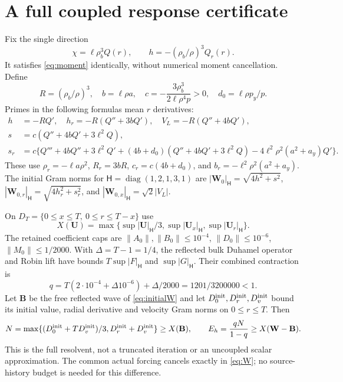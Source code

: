 \documentclass[11pt]{article}
\newcommand{\norm}[1]{\lVert #1\rVert}
\begin{document}
\section{A full coupled response certificate}\label{sec:bounds}

Fix the single direction
\begin{equation}
 \chi=\ell\rho_b^3Q(r),\qquad h=-(\rho_b/\rho)^3Q_r(r).
 \label{eq:direction}
\end{equation}
It satisfies \eqref{eq:moment} identically, without numerical moment
cancellation. Define
\begin{equation}
 R=(\rho_b/\rho)^3,\quad b=\ell\rho a,\quad
 c=-\frac{3\rho_b^3}{2\ell\rho^4p}>0,\quad d_0=\ell\rho p_y/p.
 \label{eq:profileconstants}
\end{equation}
Primes in the following formulas mean $r$ derivatives:
\begin{align}
 h&=-RQ',\quad h_r=-R(Q''+3bQ'),\quad
 V_L=-R(Q''+4bQ'),\nonumber\\
 s&=c(Q''+4bQ'+3\ell^2Q),\label{eq:profiles}\\
 s_r&=c\{Q'''+4bQ''+3\ell^2Q'
 +(4b+d_0)(Q''+4bQ'+3\ell^2Q)
 -4\ell^2\rho^2(a^2+a_y)Q'\}.\nonumber
\end{align}
These use $\rho_r=-\ell a\rho^2$, $R_r=3bR$,
$c_r=c(4b+d_0)$, and $b_r=-\ell^2\rho^2(a^2+a_y)$.
The initial Gram norms for $\mathsf H=\operatorname{diag}(1,2,1,3,1)$ are
$|\mathbf W_0|_{\mathsf H}=\sqrt{4h^2+s^2}$,
$|\mathbf W_{0,r}|_{\mathsf H}=\sqrt{4h_r^2+s_r^2}$, and
$|\mathbf W_{0,x}|_{\mathsf H}=\sqrt2|V_L|$.

On $D_T=\{0\le x\le T,\ 0\le r\le T-x\}$ use
\begin{equation}
 X(\mathbf U)=\max\{\sup|\mathbf U|_{\mathsf H}/3,
                 \sup|\mathbf U_x|_{\mathsf H},\sup|\mathbf U_r|_{\mathsf H}\}.
 \label{eq:X}
\end{equation}
The retained coefficient caps are
$\norm{A_0},\norm{B_0}\le10^{-4}$, $\norm{D_0}\le10^{-6}$,
$\norm{M_0}\le1/2000$. With $\Delta=T-1=1/4$, the reflected bulk
Duhamel operator and Robin lift have bounds $T\sup|F|_{\mathsf H}$
and $\sup|G|_{\mathsf H}$. Their combined contraction is
\begin{equation}
 q=T(2\cdot10^{-4}+\Delta10^{-6})+\Delta/2000
   =1201/3200000<1. \label{eq:q}
\end{equation}
Let $\mathbf B$ be the free reflected wave of \eqref{eq:initialW} and
let $D_0^{\rm init},D_r^{\rm init},D_v^{\rm init}$ bound its initial
value, radial derivative and velocity Gram norms on $0\le r\le T$.
Then
\begin{equation}
 N=\max\{(D_0^{\rm init}+TD_v^{\rm init})/3,
                  D_r^{\rm init}+D_v^{\rm init}\}\ge X(\mathbf B),\qquad
 E_h=\frac{qN}{1-q}\ge X(\mathbf W-\mathbf B). \label{eq:error}
\end{equation}
This is the full resolvent, not a truncated iteration or an uncoupled
scalar approximation. The common actual forcing cancels exactly in
\eqref{eq:W}; no source-history budget is needed for this difference.
\end{document}
